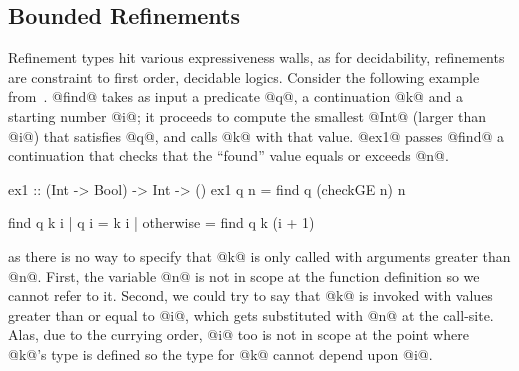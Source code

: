 \begin{comment}
\paragraph{Abstract Refinements are Automatically Instantiated} at call-sites,
via the abstract interpretation framework of Liquid Typing~\cite{vazou13}.
Each instantiation yields fresh refinement variables on
which subtyping constraints are generated; these constraints
are solved via abstract interpretation yielding the instantiations.
%
Hence, we verify @posMax@ %
by instantiating:
%
\begin{code}
  p |-> \ v -> 0 < v   -- at posMax
\end{code}

\end{comment}

\subsection{Bounded Refinements}

Refinement types hit various expressiveness walls, 
as for decidability, refinements are constraint to 
first order, decidable logics.
%
Consider the following example
from~\cite{TerauchiPOPL13}.
%
@find@ takes as input a predicate @q@, a continuation
@k@ and a starting number @i@; it proceeds to compute
the smallest @Int@ (larger than @i@) that satisfies
@q@, and calls @k@ with that value.
%
@ex1@ passes @find@ a continuation that checks that the
``found'' value equals or exceeds @n@.
%
\begin{code}
  ex1 :: (Int -> Bool) -> Int -> ()
  ex1 q n = find q (checkGE n) n

  find q k i
    | q i       = k i
    | otherwise = find q k (i + 1)
\end{code}

 as there is no way to specify that
@k@ is only called with arguments greater than @n@.
%
First, the variable @n@ is not in scope at the function
definition so we cannot refer to it.
%
Second, we could try to say that @k@ is invoked with values
greater than or equal to @i@, which gets substituted with @n@
at the call-site. Alas, due to the currying order, @i@ too is
not in scope at the point where @k@'s type is defined so
the type for @k@ cannot depend upon @i@.


